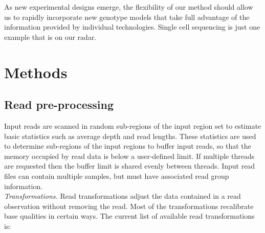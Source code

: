 \documentclass[notitlepage, twocolumn]{article}
\begin{document}
As new experimental designs emerge, the flexibility of our method should allow us to rapidly incorporate new genotype models that take full advantage of the information provided by individual technologies. Single cell sequencing is just one example that is on our radar.





\section*{Methods}\small

\subsection*{Read pre-processing}

Input reads are scanned in random sub-regions of the input region set to estimate basic statistics such as average depth and read lengths. These statistics are used to determine sub-regions of the input regions to buffer input reads, so that the memory occupied by read data is below a user-defined limit. If multiple threads are requested then the buffer limit is shared evenly between threads. Input read files can contain multiple samples, but must have associated read group information.\\

\emph{Transformations.} Read transformations adjust the data contained in a read observation without removing the read. Most of the transformations recalibrate base qualities in certain ways. The current list of available read transformations is:
\end{document}
